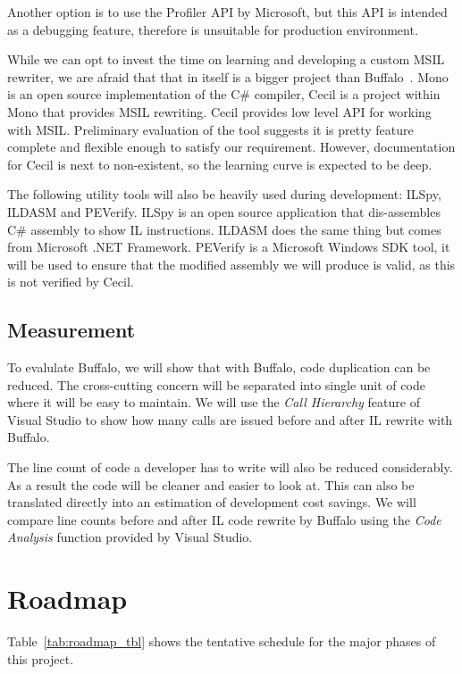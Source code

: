 Another option is to use the Profiler API by Microsoft, but this API is intended as a debugging feature, therefore is unsuitable for production environment.

While we can opt to invest the time on learning and developing a custom MSIL rewriter, we are afraid that that in itself is a bigger project than Buffalo~\cite{msil_text}. Mono is an open source implementation of the C\# compiler, Cecil is a project within Mono that provides MSIL rewriting. Cecil provides low level API for working with MSIL. Preliminary evaluation of the tool suggests it is pretty feature complete and flexible enough to satisfy our requirement. However, documentation for Cecil is next to non-existent, so the learning curve is expected to be deep.

The following utility tools will also be heavily used during development: ILSpy, ILDASM and PEVerify. ILSpy is an open source application that dis-assembles C\# assembly to show IL instructions. ILDASM does the same thing but comes from Microsoft .NET Framework. PEVerify is a Microsoft Windows SDK tool, it will be used to ensure that the modified assembly we will produce is valid, as this is not verified by Cecil.

\subsection{Measurement}
To evalulate Buffalo, we will show that with Buffalo, code duplication can be reduced. The cross-cutting concern will be separated into single unit of code where it will be easy to maintain. We will use the {\em Call Hierarchy} feature of Visual Studio to show how many calls are issued before and after IL rewrite with Buffalo. 

The line count of code a developer has to write will also be reduced considerably. As a result the code will be cleaner and easier to look at. This can also be translated directly into an estimation of development cost savings. We will compare line counts before and after IL code rewrite by Buffalo using the {\em Code Analysis} function provided by Visual Studio.

\section{Roadmap}
Table~\ref{tab:roadmap_tbl} shows the tentative schedule for the major phases of this project.

